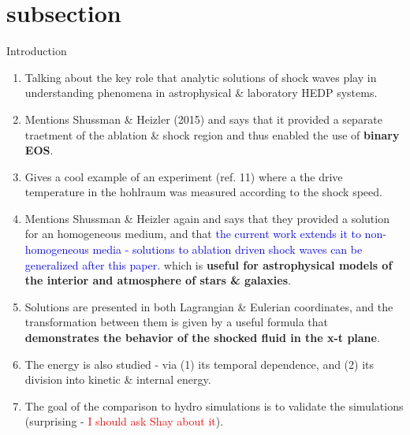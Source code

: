 \documentclass[11pt]{article}
\begin{document}
\section{subsection}{Introduction}
\begin{enumerate}
  \item Talking about the key role that analytic solutions of shock waves play in understanding phenomena in astrophysical \& laboratory HEDP systems.
  \item Mentions Shussman \& Heizler (2015) and says that it provided a separate traetment of the ablation \& shock region and thus enabled the use of \textbf{binary EOS}.
  \item Gives a cool example of an experiment (ref. 11) where a the drive temperature in the hohlraum was measured according to the shock speed.
  \item Mentions Shussman \& Heizler again and says that they provided a solution for an homogeneous medium, and that \textcolor{blue}{the current work extends it to non-homogeneous media - solutions to ablation driven shock waves can be generalized after this paper.} which is \textbf{useful for astrophysical models of the interior and atmosphere of stars \& galaxies}.
  \item Solutions are presented in both Lagrangian \& Eulerian coordinates, and the transformation between them is given by a useful formula that \textbf{demonstrates the behavior of the shocked fluid in the x-t plane}.
  \item The energy is also studied - via (1) its temporal dependence, and (2) its division into kinetic \& internal energy.
  \item The goal of the comparison to hydro simulations is to validate the simulations (surprising - \textcolor{red}{I should ask Shay about it}).
\end{enumerate}
\end{document}
